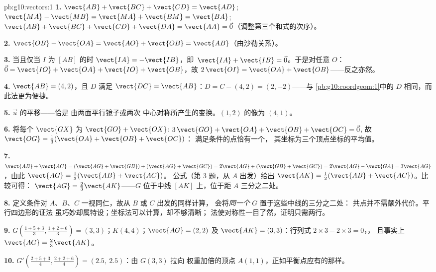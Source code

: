 \begin{solution}{pb:g10:vectors:1}
\textbf{1.} $\vect{AB} + \vect{BC} + \vect{CD} = \vect{AD}$;
\quad $\vect{MA} - \vect{MB} = \vect{MA} + \vect{BM} =
\vect{BA}$; \quad $\vect{AB} + \vect{BC} + \vect{CD} +
\vect{DA} = \vect{AA} = \vec 0$（调整第三个和式的次序）。

\textbf{2.} $\vect{OB} - \vect{OA} = \vect{AO} + \vect{OB} =
\vect{AB}$（由沙勒关系）。

\textbf{3.} 当且仅当 $I$ 为 $[AB]$ 的时
$\vect{IA} = -\vect{IB}$，即\
$\vect{IA} + \vect{IB} = \vec 0$。于是对任意 $O$：
$\vec 0 = \vect{IO} + \vect{OA} + \vect{IO} + \vect{OB}$，故
$2\,\vect{OI} = \vect{OA} + \vect{OB}$——反之亦然。

\textbf{4.} $\vect{AB} = (4, 2)$，且 $D$ 满足
$\vect{DC} = \vect{AB}$：$D = C - (4, 2) = (2, -2)$——与
\cref{pb:g10:coordgeom:1}中的 $D$ 相同，而此法更为便捷。

\textbf{5.}  $\vec u$ 的平移——恰是
由两面平行镜子或两次
中心对称所产生的变换。$(1, 2)$ 的像为 $(4, 1)$。

\textbf{6.} 将每个 $\vect{GX}$ 为
$\vect{GO} + \vect{OX}$:
$3\,\vect{GO} + \vect{OA} + \vect{OB} + \vect{OC} = \vec 0$,
故 $\vect{OG} = \frac13(\vect{OA} + \vect{OB} + \vect{OC})$：
满足条件的点恰有一个，
其坐标为三个顶点坐标的平均值。

\textbf{7.} $\vect{AB} + \vect{AC} =
(\vect{AG} + \vect{GB}) + (\vect{AG} + \vect{GC})
= 2\vect{AG} + (\vect{GB} + \vect{GC})
= 2\vect{AG} - \vect{GA} = 3\vect{AG}$，由此
$\vect{AG} = \frac13(\vect{AB} + \vect{AC})$。
公式（第 3 题，从 $A$ 出发）给出
$\vect{AK} = \frac12(\vect{AB} + \vect{AC})$。比较可得：
$\vect{AG} = \frac23\vect{AK}$——$G$ 位于中线
$[AK]$ 上，位于距 $A$ 三分之二处。

\textbf{8.} 定义条件对 $A$、$B$、$C$
一视同仁，故从 $B$ 或 $C$ 出发的同样计算，
会将\emph{同一个} $G$ 置于这些中线的三分之二处：
共点并不需额外代价。平行四边形的证法
虽巧妙却属特设；坐标法可以计算，却不够清晰；
法使对称性一目了然，证明只需两行。

\textbf{9.} $G\left(\frac{1+5+3}{3}, \frac{1+2+6}{3}\right) =
(3, 3)$；$K(4, 4)$；$\vect{AG} = (2, 2)$ 及
$\vect{AK} = (3, 3)$：行列式
$2 \times 3 - 2 \times 3 = 0$，，
且事实上 $\vect{AG} = \frac23\vect{AK}$。

\textbf{10.} $G'\left(\frac{2 + 5 + 3}{4}, \frac{2 + 2 +
6}{4}\right) = (2.5,\ 2.5)$：由 $G(3,3)$ 拉向
权重加倍的顶点 $A(1,1)$，正如平衡点应有的那样。


\end{solution}
